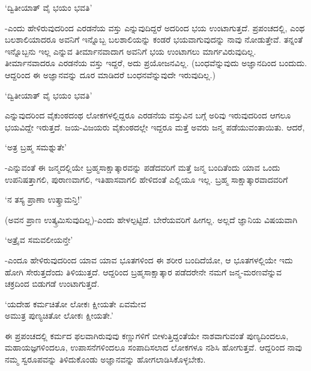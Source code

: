 \begin{shloka}
`ದ್ವಿತೀಯಾತ್ ವೈ ಭಯಂ ಭವತಿ'
\end{shloka}

-ಎಂದು ಹೇಳಿರುವುದರಿಂದ ಎರಡನೆಯ ವಸ್ತು ಎನ್ನುವುದಿದ್ದರೆ ಅದರಿಂದ ಭಯ ಉಂಟಾಗುತ್ತದೆ. ಪ್ರಪಂಚದಲ್ಲಿ, ಎಂಥ ಬಲಶಾಲಿಯಾದರೂ ಅವನಿಗೆ ಇನ್ನೊಬ್ಬ ಬಲಶಾಲಿಯನ್ನು ಕಂಡರೆ ಭಯವಾಗುವುದನ್ನು ನಾವು ನೋಡುತ್ತೇವೆ. ತನ್ನಂತೆ ಇನ್ನೊಬ್ಬನು ಇಲ್ಲ ಎನ್ನುವ ತೀರ್ಮಾನವಾದಾಗ ಅವನಿಗೆ ಭಯ ಉಂಟಾಗಲು ಮಾರ್ಗವಿರುವುದಿಲ್ಲ. ತೀರ್ಮಾನವಾದರೂ ಎರಡನೆಯ ವಸ್ತು ಇದ್ದರೆ, ಅದು ಪ್ರಯೋಜನವಿಲ್ಲ. (ಬಂಧವೆನ್ನುವುದು ಅಜ್ಞಾನದಿಂದ ಬಂದುದು. ಆದ್ದರಿಂದ ಈ ಅಜ್ಞಾನವನ್ನು ದೂರ ಮಾಡಿದರೆ ಬಂಧನವೆನ್ನುವುದೇ ಇರುವುದಿಲ್ಲ.)

\begin{shloka}
`ದ್ವಿತೀಯಾತ್ ವೈ ಭಯಂ ಭವತಿ'
\end{shloka}

ಎನ್ನುವುದರಿಂದ ವೈಕುಂಠದಂಥ ಲೋಕಗಳಲ್ಲಿದ್ದರೂ ಎರಡನೆಯ ವಸ್ತುವಿನ ಬಗ್ಗೆ ಅರಿವು ಇರುವುದರಿಂದ ಆಗಲೂ ಭಯವಿದ್ದೇ ಇರುತ್ತದೆ. ಜಯ-ವಿಜಯರು ವೈಕುಂಠದಲ್ಲೇ ಇದ್ದರೂ ಮತ್ತೆ ಅವರು ಜನ್ಮ ಪಡೆಯುವಂತಾಯಿತು. ಆದರೆ,

\begin{shloka}
`ಅತ್ರ ಬ್ರಹ್ಮ ಸಮಶ್ನುತೇ'
\end{shloka}

-ಎನ್ನುವಂತೆ ಈ ಜನ್ಮದಲ್ಲಿಯೇ ಬ್ರಹ್ಮಸಾಕ್ಷಾತ್ಕಾರವನ್ನು ಪಡೆದವರಿಗೆ ಮತ್ತೆ ಜನ್ಮ ಬಂದಿತೆಂದು ಯಾವ ಒಂದು ಉಪನಿಷತ್ತಾಗಲಿ, ಪುರಾಣವಾಗಲಿ, ಇತಿಹಾಸವಾಗಲಿ ಹೇಳಿದಂತೆ ಎಲ್ಲಿಯೂ ಇಲ್ಲ. ಬ್ರಹ್ಮ ಸಾಕ್ಷಾತ್ಕಾರವಾದವರಿಗೆ

\begin{shloka}
`ನ ತಸ್ಯ ಪ್ರಾಣಾ ಉತ್ಕ್ರಾಮನ್ತಿ!'
\end{shloka}

(ಅವನ ಪ್ರಾಣ ಉತ್ಕ್ರಮಿಸುವುದಿಲ್ಲ)-ಎಂದು ಹೇಳಲ್ಪಟ್ಟಿದೆ. ಬೇರೆಯವರಿಗೆ ಹೀಗಲ್ಲ. ಅಲ್ಲದೆ ಜ್ಞಾನಿಯ ವಿಷಯವಾಗಿ

\begin{shloka}
`ಅತ್ರೈವ ಸಮವಲೀಯನ್ತೇ'
\end{shloka}

-ಎಂದೂ ಹೇಳಿರುವುದರಿಂದ ಯಾವ ಯಾವ ಭೂತಗಳಿಂದ ಈ ಶರೀರ ಬಂದಿದೆಯೋ, ಆ ಭೂತಗಳಲ್ಲಿಯೇ ಇದು ಹೋಗಿ ಸೇರುತ್ತದೆಂದು ತಿಳಿಯುತ್ತದೆ. ಆದ್ದರಿಂದ ಬ್ರಹ್ಮಸಾಕ್ಷಾತ್ಕಾರ ಪಡೆದರೇನೇ ನಮಗೆ ಜನ್ಮ-ಮರಣವೆನ್ನುವ ಚಕ್ರದಿಂದ ಬಿಡುಗಡೆ ಉಂಟಾಗುತ್ತದೆ.

\begin{shloka}
`ಯದೇಹ ಕರ್ಮಚಿತೋ ಲೋಕಃ ಕ್ಷೀಯತೇ ಏವಮೇವ\\
ಅಮುತ್ರ ಪುಣ್ಯಚಿತೋ ಲೋಕಃ ಕ್ಷೀಯತೇ.'
\end{shloka}

ಈ ಪ್ರಪಂಚದಲ್ಲಿ ಕರ್ಮದ ಫಲವಾಗಿರುವುವು ಕಣ್ಣುಗಳಿಗೆ ಬೀಳುತ್ತಿದ್ದಂತೆಯೇ ನಾಶವಾಗುವಂತೆ ಪುಣ್ಯದಿಂದಲೂ, ಮಹಾಯಜ್ಞಗಳಿಂದಲೂ, ಉಪಾಸನೆಗಳಿಂದಲೂ ಸಂಪಾದಿಸಲಾದ ಲೋಕಗಳೂ ನಶಿಸಿ ಹೋಗುತ್ತವೆ. ಆದ್ದರಿಂದ ನಾವು ನಮ್ಮ ಸ್ವರೂಪವನ್ನು ತಿಳಿದುಕೊಂಡು ಅಜ್ಞಾನವನ್ನು ಹೋಗಲಾಡಿಸಿಕೊಳ್ಳಬೇಕು.

